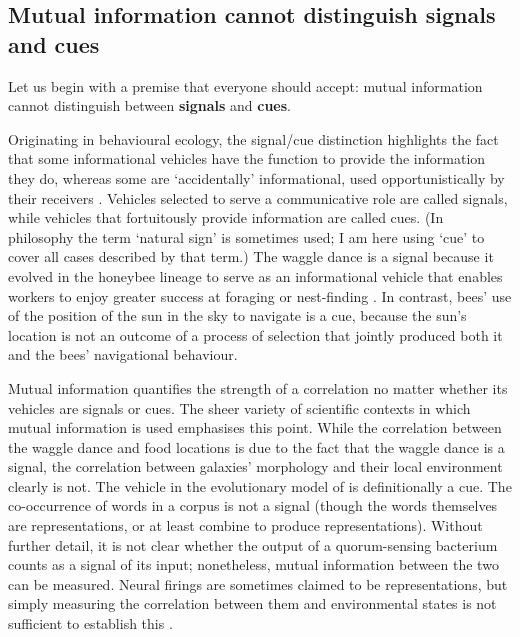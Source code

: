 \documentclass[12pt]{article}
\begin{document}
\subsection{Mutual information cannot distinguish signals and cues}

Let us begin with a premise that everyone should accept: mutual information cannot distinguish between \textbf{signals} and \textbf{cues}.

Originating in behavioural ecology, the signal/cue distinction highlights the fact that some informational vehicles have the function to provide the information they do, whereas some are `accidentally' informational, used opportunistically by their receivers \citep[$\S$1.2]{maynardsmith2003animal}.
Vehicles selected to serve a communicative role are called signals, while vehicles that fortuitously provide information are called cues.
(In philosophy the term `natural sign' is sometimes used; I am here using `cue' to cover all cases described by that term.)
The waggle dance is a signal because it evolved in the honeybee lineage to serve as an informational vehicle that enables workers to enjoy greater success at foraging or nest-finding \citep{gould1975honey,riley2005flight}.
In contrast, bees' use of the position of the sun in the sky to navigate is a cue, because the sun's location is not an outcome of a process of selection that jointly produced both it and the bees' navigational behaviour.

Mutual information quantifies the strength of a correlation no matter whether its vehicles are signals or cues.
The sheer variety of scientific contexts in which mutual information is used emphasises this point.
While the correlation between the waggle dance and food locations is due to the fact that the waggle dance is a signal, the correlation between galaxies' morphology and their local environment clearly is not.
The vehicle in the evolutionary model of \citet{donaldson-matasci2010fitness} is definitionally a cue.
The co-occurrence of words in a corpus is not a signal (though the words themselves are representations, or at least combine to produce representations).
Without further detail, it is not clear whether the output of a quorum-sensing bacterium counts as a signal of its input; nonetheless, mutual information between the two can be measured.
Neural firings are sometimes claimed to be representations, but simply measuring the correlation between them and environmental states is not sufficient to establish this \citep{rathkopf2017neural}.
\end{document}
